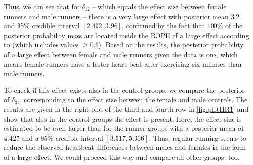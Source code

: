 Thus, we can see that for $\delta_{12}$ -- which equals the effect size between female runners and male runners -- there is a very large effect with posterior mean $3.2$ and 95\% credible interval $[2.402,3.96]$, confirmed by the fact that $100\%$ of the posterior probability mass are located inside the ROPE of a large effect according to \cite{cohen_statistical_1988} (which includes values $\geq 0.8$). Based on the results, the posterior probability of a large effect between female and male runners given the data is one, which means female runners have a faster heart beat after exercising six minutes than male runners. 

To check if this effect exists also in the control groups, we compare the posterior of $\delta_{34}$, corresponding to the effect size between the female and male controls. The results are given in the right plot of the third and fourth row in  \ref{fig:plotHR1} and show that also in the control groups the effect is present. Here, the effect size is estimated to be even larger than for the runner groups with a posterior mean of $4.427$ and a 95\% credible interval $[3.517,5.366]$. Thus, regular running seems to reduce the observed heartbeat differences between males and females in the form of a large effect. We could proceed this way and compare all other groups, too.

